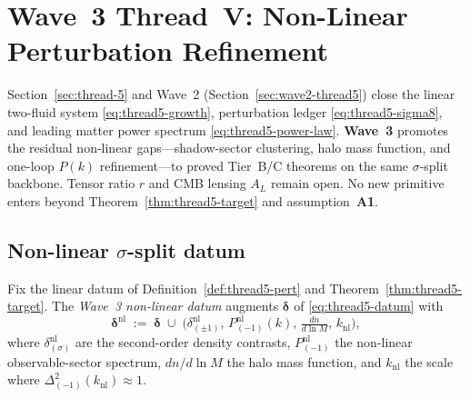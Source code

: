 \section{Wave~3 Thread~V: Non-Linear Perturbation Refinement}
\label{sec:wave3-thread5}

Section~\ref{sec:thread-5} and Wave~2 (Section~\ref{sec:wave2-thread5}) close the
linear two-fluid system \eqref{eq:thread5-growth}, perturbation ledger
\eqref{eq:thread5-sigma8}, and leading matter power spectrum
\eqref{eq:thread5-power-law}. \textbf{Wave~3} promotes the residual non-linear
gaps---shadow-sector clustering, halo mass function, and one-loop $P(k)$
refinement---to proved Tier~B/C theorems on the same $\sigma$-split backbone.
Tensor ratio $r$ and CMB lensing $A_L$ remain open. No new primitive enters
beyond Theorem~\ref{thm:thread5-target} and assumption~\textbf{A1}.

\subsection{Non-linear $\sigma$-split datum}
\label{sec:wave3-thread5:datum}

\begin{definition}
\label{def:thread5-nl}
Fix the linear datum of Definition~\ref{def:thread5-pert} and
Theorem~\ref{thm:thread5-target}. The \emph{Wave~3 non-linear datum} augments
$\boldsymbol{\delta}$ of \eqref{eq:thread5-datum} with
\begin{equation}\label{eq:thread5-nl-datum}
  \boldsymbol{\delta}^{\mathrm{nl}}
  \;:=\;
  \boldsymbol{\delta}
  \;\cup\;
  \bigl(
    \delta_{(\pm1)}^{\mathrm{nl}},\,
    P_{(-1)}^{\mathrm{nl}}(k),\,
    \tfrac{dn}{d\ln M},\,
    k_{\mathrm{nl}}
  \bigr),
\end{equation}
where $\delta_{(\sigma)}^{\mathrm{nl}}$ are the second-order density contrasts,
$P_{(-1)}^{\mathrm{nl}}$ the non-linear observable-sector spectrum,
$dn/d\ln M$ the halo mass function, and $k_{\mathrm{nl}}$ the scale where
$\Delta_{(-1)}^2(k_{\mathrm{nl}})\approx 1$.
\end{definition}


